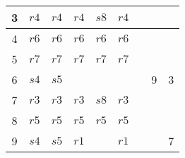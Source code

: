 \documentclass[boxes]{homework}
\begin{document}
\begin{solution}
\begin{table}[ht]
\begin{tabular}{c|ccccc|ccc}
            3                     & $r4$                      & $r4$                     & $r4$ & $s8$ & $r4$  &     &     &     \\ \hline
            4                     & $r6$                      & $r6$                     & $r6$ & $r6$ & $r6$  &     &     &     \\ \hline
            5                     & $r7$                      & $r7$                     & $r7$ & $r7$ & $r7$  &     &     &     \\ \hline
            6                     & $s4$                      & $s5$                     &      &      &       &     & 9   & 3   \\ \hline
            7                     & $r3$                      & $r3$                     & $r3$ & $s8$ & $r3$  &     &     &     \\ \hline
            8                     & $r5$                      & $r5$                     & $r5$ & $r5$ & $r5$  &     &     &     \\ \hline
            9                     & $s4$                      & $s5$                     & $r1$ &      & $r1$  &     &     & 7   \\ \hline
        \end{tabular}
    \end{table}
\end{solution}
\vspace*{-2em}
\end{document}
